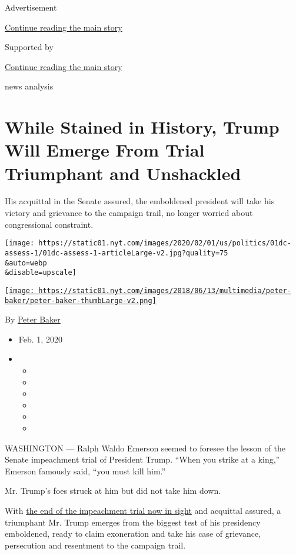 Advertisement

\protect\hyperlink{after-top}{Continue reading the main story}

Supported by

\protect\hyperlink{after-sponsor}{Continue reading the main story}

news analysis

\hypertarget{while-stained-in-history-trump-will-emerge-from-trial-triumphant-and-unshackled}{%
\section{While Stained in History, Trump Will Emerge From Trial
Triumphant and
Unshackled}\label{while-stained-in-history-trump-will-emerge-from-trial-triumphant-and-unshackled}}

His acquittal in the Senate assured, the emboldened president will take
his victory and grievance to the campaign trail, no longer worried about
congressional constraint.

\texttt{[image: https://static01.nyt.com/images/2020/02/01/us/politics/01dc-assess-1/01dc-assess-1-articleLarge-v2.jpg?quality=75\\\&auto=webp\\\&disable=upscale]}

\href{https://www.nytimes.com/by/peter-baker}{\texttt{[image: https://static01.nyt.com/images/2018/06/13/multimedia/peter-baker/peter-baker-thumbLarge-v2.png]}}

By \href{https://www.nytimes.com/by/peter-baker}{Peter Baker}

\begin{itemize}
\item
  Feb. 1, 2020
\item
  \begin{itemize}
  \item
  \item
  \item
  \item
  \item
  \item
  \end{itemize}
\end{itemize}

WASHINGTON --- Ralph Waldo Emerson seemed to foresee the lesson of the
Senate impeachment trial of President Trump. ``When you strike at a
king,'' Emerson famously said, ``you must kill him.''

Mr. Trump's foes struck at him but did not take him down.

With
\href{https://www.nytimes.com/2020/01/31/us/politics/trump-impeachment-trial.html?action=click\&module=Spotlight\&pgtype=Homepage}{the
end of the impeachment trial now in sight} and acquittal assured, a
triumphant Mr. Trump emerges from the biggest test of his presidency
emboldened, ready to claim exoneration and take his case of grievance,
persecution and resentment to the campaign trail.

